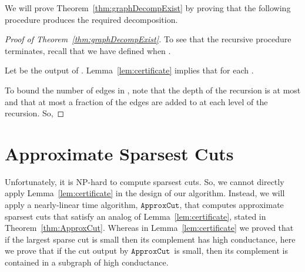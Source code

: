 \documentclass[11pt]{article}
\newcommand{\approxcut}{\ensuremath{\mathtt{ApproxCut}}}
\begin{document}
We will prove Theorem~\ref{thm:graphDecompExist} by proving that
  the following procedure produces the required decomposition.


\vskip 0.2in
\noindent
{}
\vskip 0.2in

\begin{proof}[Proof of Theorem~\ref{thm:graphDecompExist}]
To see that the recursive procedure terminates, recall that we have defined
   when .

Let  be the output of .
Lemma~\ref{lem:certificate} implies that
   for each .

To bound the number of edges in ,
  note that the depth of the recursion is at most 
  and that at most a  fraction of the edges are added to
   at each level of the recursion.
So, 

\end{proof}



\section{Approximate Sparsest Cuts}\label{sec:approxCut}

Unfortunately, it is NP-hard to compute sparsest cuts.
So, we cannot directly
  apply Lemma~\ref{lem:certificate} in the design of our algorithm.
Instead, we will apply a nearly-linear time algorithm, \approxcut,
  that computes approximate sparsest cuts that satisfy an analog of
  Lemma~\ref{lem:certificate}, stated in Theorem~\ref{thm:ApproxCut}.
Whereas in Lemma~\ref{lem:certificate} we proved that if the largest sparse cut
  is small then its
  complement has high conductance,
  here we prove that if the cut output by \approxcut\ is small, then
  its complement is contained in a subgraph of high conductance.
\end{document}
